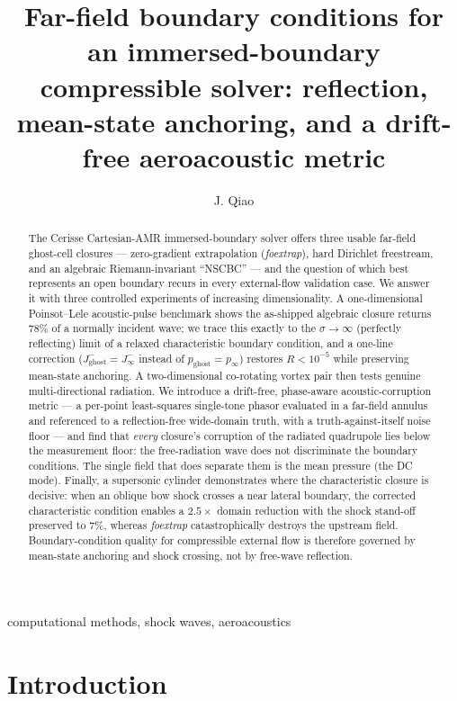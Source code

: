 \documentclass{jfm}
\title{Far-field boundary conditions for an immersed-boundary
compressible solver: reflection, mean-state anchoring, and a
drift-free aeroacoustic metric}
\author{J. Qiao\aff{1}
  \corresp{\email{qiaojiaye970122@gmail.com}}}
\affiliation{\aff{1}Cerisse compressible immersed-boundary solver,
validation campaign}
\newcommand{\pinf}{p_\infty}
\begin{document}
\maketitle

\begin{abstract}
The Cerisse Cartesian-AMR immersed-boundary solver offers three usable
far-field ghost-cell closures --- zero-gradient extrapolation
(\textit{foextrap}), hard Dirichlet freestream, and an algebraic
Riemann-invariant ``NSCBC'' --- and the question of which best represents an
open boundary recurs in every external-flow validation case. We answer it with
three controlled experiments of increasing dimensionality. A one-dimensional
Poinsot--Lele acoustic-pulse benchmark shows the as-shipped algebraic closure
returns $78\%$ of a normally incident wave; we trace this exactly to the
$\sigma\!\to\!\infty$ (perfectly reflecting) limit of a relaxed
characteristic boundary condition, and a one-line correction
($J^-_{\mathrm{ghost}}=J^-_\infty$ instead of $p_{\mathrm{ghost}}=\pinf$)
restores $R<10^{-5}$ while preserving mean-state anchoring. A two-dimensional
co-rotating vortex pair then tests genuine multi-directional radiation. We
introduce a drift-free, phase-aware acoustic-corruption metric --- a per-point
least-squares single-tone phasor evaluated in a far-field annulus and
referenced to a reflection-free wide-domain truth, with a
truth-against-itself noise floor --- and find that \textit{every} closure's
corruption of the radiated quadrupole lies below the measurement floor: the
free-radiation wave does not discriminate the boundary conditions. The single
field that does separate them is the mean pressure (the DC mode). Finally, a
supersonic cylinder demonstrates where the characteristic closure is decisive:
when an oblique bow shock crosses a near lateral boundary, the corrected
characteristic condition enables a $2.5\times$ domain reduction with the shock
stand-off preserved to $7\%$, whereas \textit{foextrap} catastrophically
destroys the upstream field. Boundary-condition quality for compressible
external flow is therefore governed by mean-state anchoring and shock crossing,
not by free-wave reflection.
\end{abstract}

\begin{keywords}
computational methods, shock waves, aeroacoustics
\end{keywords}

\section{Introduction}\label{sec:intro}
\end{document}
